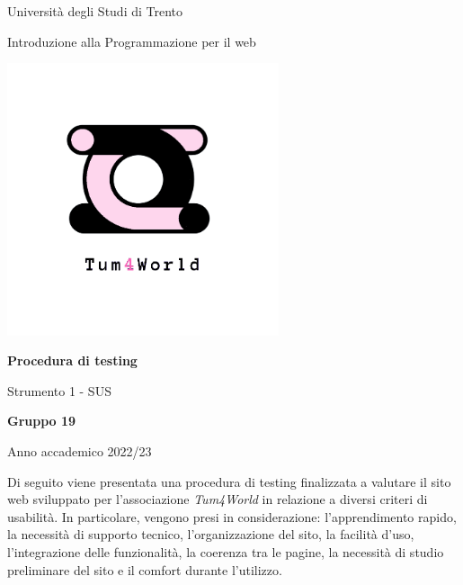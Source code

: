 \documentclass{article}
\begin{document}
\begin{titlepage}
    \begin{center}
        \Large
        Università degli Studi di Trento

        \vspace{0.5cm}

        \Large
        Introduzione alla Programmazione per il web

        \includegraphics[width=0.6\textwidth]{logo_home_new.png}
        
        \vfill

        \Huge
        \textbf{Procedura di testing}

        \vspace{0.5cm}

        \Large
        Strumento 1 - SUS

        \vspace{5cm}
        
        \Large
        \textbf{Gruppo 19}

        \vspace{0.5cm}
        
        \Large
        Anno accademico 2022/23
    \end{center}
\end{titlepage}

\tableofcontents
\pagebreak

\noindent Di seguito viene presentata una procedura di testing finalizzata a valutare il sito web sviluppato per l'associazione \textit{Tum4World} in relazione a diversi criteri di usabilità. In particolare, vengono presi in considerazione: l'apprendimento rapido, la necessità di supporto tecnico, l'organizzazione del sito, la facilità d'uso, l'integrazione delle funzionalità, la coerenza tra le pagine, la necessità di studio preliminare del sito e il comfort durante l'utilizzo.\\
\end{document}
